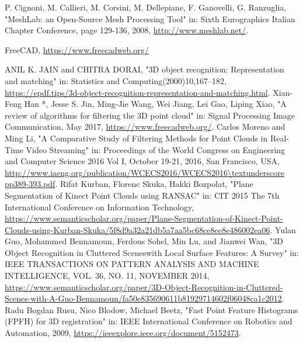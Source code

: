 \begin{thebibliography}{1}
		P. Cignoni, M. Callieri, M. Corsini, M. Dellepiane, F. Ganovelli, G. Ranzuglia,
		"MeshLab: an Open-Source Mesh Processing Tool" in: Sixth Eurographics Italian Chapter Conference, page 129-136, 2008, \url{http://www.meshlab.net/}.

		FreeCAD,
		\url{https://www.freecadweb.org/}

		ANIL K. JAIN and CHITRA DORAI,
		"3D object recognition: Representation and matching" in: Statistics and Computing(2000)10,167–182, \url{https://epdf.tips/3d-object-recognition-representation-and-matching.html}.
		Xian-Feng Han *, Jesse S. Jin, Ming-Jie Wang, Wei Jiang, Lei Gao, Liping Xiao,
		"A review of algorithms for filtering the 3D point cloud" in: Signal Processing Image Communication, May 2017, \url{https://www.freecadweb.org/}.
		Carlos Moreno and Ming Li,
		"A Comparative Study of Filtering Methods for Point Clouds in Real-Time Video Streaming" in: Proceedings of the World Congress on Engineering and Computer Science 2016 Vol I, October 19-21, 2016, San Francisco, USA, \url{http://www.iaeng.org/publication/WCECS2016/WCECS2016\textunderscore pp389-393.pdf}.
		Rifat Kurban, Florenc Skuka, Hakki Bozpolat,
		"Plane Segmentation of Kinect Point Clouds using RANSAC" in: CIT 2015 The 7th International Conference on Information Technology, \url{https://www.semanticscholar.org/paper/Plane-Segmentation-of-Kinect-Point-Clouds-using-Kurban-Skuka/5f8d9a32a21db5a7aa5bc68ce8ee8e486002ea06}.
		Yulan Guo, Mohammed Bennamoun, Ferdous Sohel, Min Lu, and Jianwei Wan,
		"3D Object Recognition in Cluttered Sceneswith Local Surface Features: A Survey" in: IEEE TRANSACTIONS ON PATTERN ANALYSIS AND MACHINE INTELLIGENCE,  VOL. 36,  NO. 11,  NOVEMBER 2014, \url{https://www.semanticscholar.org/paper/3D-Object-Recognition-in-Cluttered-Scenes-with-A-Guo-Bennamoun/fa50e835690611b81929714602f06048ca1c2012}.
		Radu Bogdan Rusu, Nico Blodow, Michael Beetz,
		"Fast Point Feature Histograms (FPFH) for 3D registration" in: IEEE International Conference on Robotics and Automation, 2009, \url{https://ieeexplore.ieee.org/document/5152473}.
\end{thebibliography}
